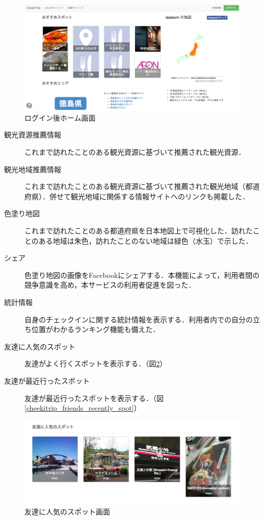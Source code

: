 \documentclass{jsarticle}
\begin{document}
\begin{figure}[!ht]
\begin{center}
\includegraphics[width=12.0cm]{./image/cheekitrip_home.png}
\caption{ログイン後ホーム画面}
\label{cheekitrip_home}
\end{center}
\end{figure}

\begin{description}
\item[観光資源推薦情報] これまで訪れたことのある観光資源に基づいて推薦された観光資源．
\item[観光地域推薦情報] これまで訪れたことのある観光資源に基づいて推薦された観光地域（都道府県）．併せて観光地域に関係する情報サイトへのリンクも掲載した．
\item[色塗り地図] これまで訪れたことのある都道府県を日本地図上で可視化した．訪れたことのある地域は朱色，訪れたことのない地域は緑色（水玉）で示した．
\item[シェア] 色塗り地図の画像をFacebookにシェアする．本機能によって，利用者間の競争意識を高め，本サービスの利用者促進を図った．
\item[統計情報] 自身のチェックインに関する統計情報を表示する．利用者内での自分の立ち位置がわかるランキング機能も備えた．
\item[友達に人気のスポット] 友達がよく行くスポットを表示する．（図\ref{cheekitrip_friends_popular_spot}）
\item[友達が最近行ったスポット] 友達が最近行ったスポットを表示する．（図\ref{cheekitrip_friends_recently_spot}）
\end{description}

\begin{figure}[!ht]
\begin{center}
\includegraphics[width=12.0cm]{./image/cheekitrip_friends_popular_spot.png}
\caption{友達に人気のスポット画面}
\label{cheekitrip_friends_popular_spot}
\end{center}
\end{figure}
\end{document}
